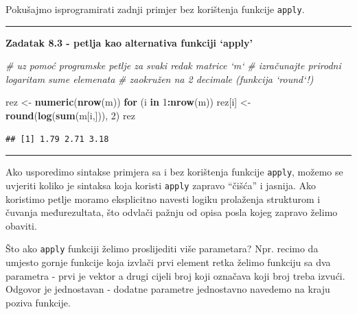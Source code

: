 \documentclass[]{book}
\newenvironment{Shaded}{\begin{snugshade}}{\end{snugshade}}
\newcommand{\KeywordTok}[1]{\textcolor[rgb]{0.13,0.29,0.53}{\textbf{#1}}}
\newcommand{\DecValTok}[1]{\textcolor[rgb]{0.00,0.00,0.81}{#1}}
\newcommand{\StringTok}[1]{\textcolor[rgb]{0.31,0.60,0.02}{#1}}
\newcommand{\CommentTok}[1]{\textcolor[rgb]{0.56,0.35,0.01}{\textit{#1}}}
\newcommand{\ControlFlowTok}[1]{\textcolor[rgb]{0.13,0.29,0.53}{\textbf{#1}}}
\newcommand{\OperatorTok}[1]{\textcolor[rgb]{0.81,0.36,0.00}{\textbf{#1}}}
\newcommand{\NormalTok}[1]{#1}
\theoremstyle{definition}
\theoremstyle{definition}
\theoremstyle{definition}
\theoremstyle{remark}
\begin{document}
Pokušajmo isprogramirati zadnji primjer bez korištenja funkcije
\texttt{apply}.

\begin{center}\rule{0.5\linewidth}{\linethickness}\end{center}

\textbf{Zadatak 8.3 - petlja kao alternativa funkciji `apply'}

\begin{Shaded}
\begin{Highlighting}[]
\CommentTok{# uz pomoć programske petlje za svaki redak matrice `m` }
\CommentTok{# izračunajte prirodni logaritam sume elemenata}
\CommentTok{# zaokružen na 2 decimale  (funkcija `round`!)}
\end{Highlighting}
\end{Shaded}

\begin{Shaded}
\begin{Highlighting}[]
\NormalTok{rez <-}\StringTok{ }\KeywordTok{numeric}\NormalTok{(}\KeywordTok{nrow}\NormalTok{(m))}
\ControlFlowTok{for}\NormalTok{ (i }\ControlFlowTok{in} \DecValTok{1}\OperatorTok{:}\KeywordTok{nrow}\NormalTok{(m)) rez[i] <-}\StringTok{ }\KeywordTok{round}\NormalTok{(}\KeywordTok{log}\NormalTok{(}\KeywordTok{sum}\NormalTok{(m[i,])), }\DecValTok{2}\NormalTok{)}
\NormalTok{rez}
\end{Highlighting}
\end{Shaded}

\begin{verbatim}
## [1] 1.79 2.71 3.18
\end{verbatim}

\begin{center}\rule{0.5\linewidth}{\linethickness}\end{center}

Ako usporedimo sintakse primjera sa i bez korištenja funkcije
\texttt{apply}, možemo se uvjeriti koliko je sintaksa koja koristi
\texttt{apply} zapravo ``čišća'' i jasnija. Ako koristimo petlje moramo
eksplicitno navesti logiku prolaženja strukturom i čuvanja
međurezultata, što odvlači pažnju od opisa posla kojeg zapravo želimo
obaviti.

Što ako \texttt{apply} funkciji želimo proslijediti više parametara?
Npr. recimo da umjesto gornje funkcije koja izvlači prvi element retka
želimo funkciju sa dva parametra - prvi je vektor a drugi cijeli broj
koji označava koji broj treba izvući. Odgovor je jednostavan - dodatne
parametre jednostavno navedemo na kraju poziva funkcije.
\end{document}
